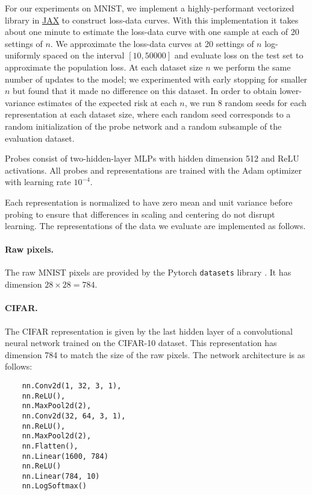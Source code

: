 For our experiments on MNIST, we implement a highly-performant vectorized library in \hyperlink{https://jax.readthedocs.io/en/latest/}{JAX} to construct loss-data curves.
With this implementation it takes about one minute to estimate the loss-data curve with one sample at each of 20 settings of $n$.
We approximate the loss-data curves at 20 settings of $n$ log-uniformly spaced on the interval $[10, 50000]$ and evaluate loss on the test set to approximate the population loss.
At each dataset size $n$ we perform the same number of updates to the model; we experimented with early stopping for smaller $n$ but found that it made no difference on this dataset.
In order to obtain lower-variance estimates of the expected risk at each $n$, we run 8 random seeds for each representation at each dataset size, where each random seed corresponds to a random initialization of the probe network and a random subsample of the evaluation dataset.

Probes consist of two-hidden-layer MLPs with hidden dimension 512 and ReLU activations.
All probes and representations are trained with the Adam optimizer \citep{Kingma2015AdamAM} with learning rate $10^{-4}$.

Each representation is normalized to have zero mean and unit variance before probing to ensure that differences in scaling and centering do not disrupt learning.
The representations of the data we evaluate are implemented as follows.

\paragraph{Raw pixels.}
The raw MNIST pixels are provided by the Pytorch \texttt{datasets} library \citep{Paszke2019PyTorchAI}.
It has dimension $28 \times 28 = 784$.

\paragraph{CIFAR.}
The CIFAR representation is given by the last hidden layer of a convolutional neural network trained on the CIFAR-10 dataset.
This representation has dimension 784 to match the size of the raw pixels.
The network architecture is as follows:

\begin{verbatim}
    nn.Conv2d(1, 32, 3, 1),
    nn.ReLU(),
    nn.MaxPool2d(2),
    nn.Conv2d(32, 64, 3, 1),
    nn.ReLU(),
    nn.MaxPool2d(2),
    nn.Flatten(),
    nn.Linear(1600, 784)
    nn.ReLU()
    nn.Linear(784, 10)
    nn.LogSoftmax()
\end{verbatim}

